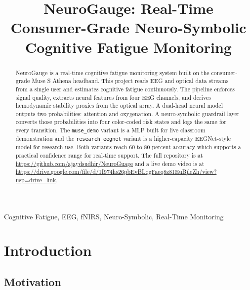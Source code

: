 \documentclass[conference]{IEEEtran}
\begin{document}
\title{NeuroGauge: Real-Time Consumer-Grade Neuro-Symbolic Cognitive Fatigue Monitoring}

\author{
}

\maketitle

\begin{abstract}
NeuroGauge is a real-time cognitive fatigue monitoring system built on the consumer-grade Muse S Athena headband. This project reads EEG and optical data streams from a single user and estimates cognitive fatigue continuously. The pipeline enforces signal quality, extracts neural features from four EEG channels, and derives hemodynamic stability proxies from the optical array. A dual-head neural model outputs two probabilities: attention and oxygenation. A neuro-symbolic guardrail layer converts those probabilities into four color-coded risk states and logs the same for every transition. The \texttt{muse\_demo} variant is a MLP built for live classroom demonstration and the \texttt{research\_eegnet} variant is a higher-capacity EEGNet-style model for research use. Both variants reach 60 to 80 percent accuracy which supports a practical confidence range for real-time support. The full repository is at \url{https://github.com/ajaydsudhir/NeuroGuage} and a live demo video is at \url{https://drive.google.com/file/d/1I974hs26pbEvBLqgFaeq8z81EuBjleZh/view?usp=drive_link}.
\end{abstract}

\begin{IEEEkeywords}
Cognitive Fatigue, EEG, fNIRS, Neuro-Symbolic, Real-Time Monitoring
\end{IEEEkeywords}

\section{Introduction}

\subsection{Motivation}
\end{document}
